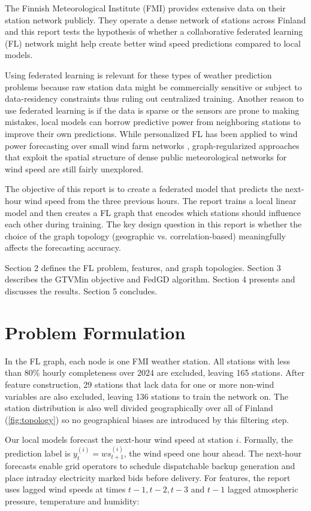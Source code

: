 \documentclass{article}
\begin{document}
The Finnish Meteorological Institute (FMI) provides extensive data on their station
network publicly. They operate a dense network of stations across Finland and this
report tests the hypothesis of whether a collaborative federated learning (FL)
network might help create better wind speed predictions compared to local models.

Using federated learning is relevant for these types of weather prediction problems
because raw station data might be commercially sensitive or subject to data-residency
constraints thus ruling out centralized training. Another reason to use federated
learning is if the data is sparse or the sensors are prone to making
mistakes, local models can borrow predictive power from neighboring stations to
improve their own predictions. While personalized FL has been applied to wind
power forecasting over small wind farm networks \cite{LiWind2023},
graph-regularized approaches that exploit the spatial structure of dense
public meteorological networks for wind speed are still fairly unexplored.

The objective of this report is to create a federated model that predicts the next-hour
wind speed from the three previous hours. The report trains a local linear model
and then creates a FL graph that encodes which stations should influence each other
during training. The key design question in this report is whether the choice of the
graph topology (geographic vs. correlation-based) meaningfully affects the
forecasting accuracy.

Section 2 defines the FL problem, features, and graph topologies. Section 3 describes
the GTVMin objective and FedGD algorithm. Section 4 presents and discusses the results.
Section 5 concludes.

\section{Problem Formulation}
\label{sec:pf}

In the FL graph, each node is one FMI weather station. All stations with less than
80\% hourly completeness over 2024 are excluded, leaving 165 stations. After feature
construction, 29 stations that lack data for one or more non-wind variables are also
excluded, leaving 136 stations to train the network on. The station distribution is also well divided geographically
over all of Finland (\cref{fig:topology}) so no geographical biases are introduced by
this filtering step.

Our local models forecast the next-hour wind speed at station $i$. Formally, the
prediction label is $y^{(i)}_t = ws^{(i)}_{t+1}$, the wind speed one hour ahead.
The next-hour forecasts enable grid operators to schedule dispatchable backup
generation and place intraday electricity marked bids before delivery. For
features, the report uses lagged wind speeds at times $t - 1, t - 2, t - 3$
and $t - 1$ lagged atmospheric pressure, temperature and humidity:
\end{document}
